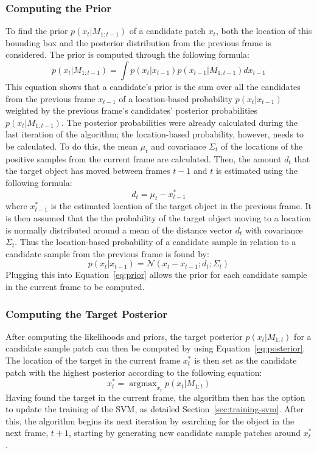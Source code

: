 \documentclass{sig-alternate-05-2015}
\DeclareMathOperator*{\argmax}{argmax} %
\begin{document}
\subsubsection{Computing the Prior}
To find the prior $p(x_t|M_{1:t-1})$ of a candidate patch $x_t$, both the location of this bounding box and the posterior distribution from the previous frame is considered.
The prior is computed through the following formula:
\begin{equation}
\label{eq:prior}
p(x_t|M_{1:t-1}) = \int p(x_t|x_{t-1}) p(x_{t-1}|M_{1:t-1}) dx_{t-1}
\end{equation}
This equation shows that a candidate's prior is the sum over all the candidates from the previous frame $x_{t-1}$ of a location-based probability $p(x_t|x_{t-1})$ weighted by the previous frame's candidates' posterior probabilities $p(x_t|M_{1:t-1})$.
The posterior probabilities were already calculated during the last iteration of the algorithm; the location-based probability, however, needs to be calculated.
To do this, the mean $\mu_t$ and covariance $\Sigma_t$ of the locations of the positive samples from the current frame are calculated.
Then, the amount $d_t$ that the target object has moved between frames $t-1$ and $t$ is estimated using the following formula:
\begin{equation}
d_t = \mu_t - x^*_{t-1}
\end{equation}
where $x^*_{t-1}$ is the estimated location of the target object in the previous frame.
It is then assumed that the the probability of the target object moving to a location is normally distributed around a mean of the distance vector $d_t$ with covariance $\Sigma_t$.
Thus the location-based probability of a candidate sample in relation to a candidate sample from the previous frame is found by:
\begin{equation}
\label{eq:loc-based-prob-prior}
p(x_t|x_{t-1}) = \mathcal{N}(x_t-x_{t-1}; d_t ; \Sigma_t)
\end{equation}
Plugging this into Equation~\ref{eq:prior} allows the prior for each candidate sample in the current frame to be computed.

\subsubsection{Computing the Target Posterior}
After computing the likelihoods and priors, the target posterior $p(x_t|M_{1:t})$ for a candidate sample patch can then be computed by using Equation~\ref{eq:posterior}.
The location of the target in the current frame $x_t^*$ is then set as the candidate patch with the highest posterior according to the following equation:
\begin{equation}
x_t^* = \argmax_{x_t} p(x_t|M_{1:t})
\end{equation}
Having found the target in the current frame, the algorithm then has the option to update the training of the SVM, as detailed Section~\ref{sec:training-svm}.
After this, the algorithm begins its next iteration by searching for the object in the next frame, $t+1$, starting by generating new candidate sample patches around $x_t^*$.
\end{document}
